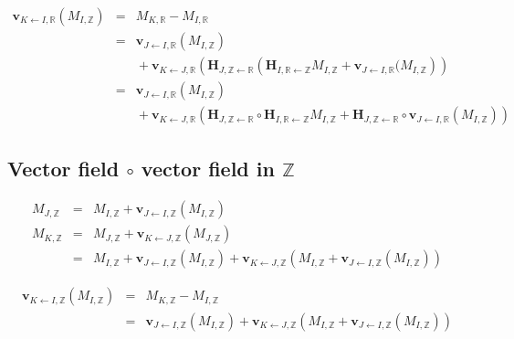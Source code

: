 \begin{eqnarray*}
\mathbf{v}_{K \leftarrow I, \mathbb{R}}(M_{I, \mathbb{Z}})
& = &
M_{K, \mathbb{R}} - M_{I, \mathbb{R}} \\
& = &
\mathbf{v}_{J \leftarrow I, \mathbb{R}}(M_{I, \mathbb{Z}}) \\
& & {}
+ \mathbf{v}_{K \leftarrow J, \mathbb{R}}
\left(
\mathbf{H}_{J, \mathbb{Z} \leftarrow \mathbb{R}} 
\left( 
\mathbf{H}_{I, \mathbb{R} \leftarrow \mathbb{Z}} M_{I, \mathbb{Z}}
+ 
\mathbf{v}_{J \leftarrow I, \mathbb{R}}(M_{I, \mathbb{Z}}
\right)
\right) \\
& = &
\mathbf{v}_{J \leftarrow I, \mathbb{R}}(M_{I, \mathbb{Z}}) \\
& & {}
+ \mathbf{v}_{K \leftarrow J, \mathbb{R}}
\left(
\mathbf{H}_{J, \mathbb{Z} \leftarrow \mathbb{R}} 
\circ
\mathbf{H}_{I, \mathbb{R} \leftarrow \mathbb{Z}} M_{I, \mathbb{Z}}
+ 
\mathbf{H}_{J, \mathbb{Z} \leftarrow \mathbb{R}} 
\circ \mathbf{v}_{J \leftarrow I, \mathbb{R}}(M_{I, \mathbb{Z}})
\right)
\end{eqnarray*}





\subsection{Vector field $\circ$ vector field in $\mathbb{Z}$ }


\begin{eqnarray*}
M_{J, \mathbb{Z}} & =  &
M_{I, \mathbb{Z}} 
+ \mathbf{v}_{J \leftarrow I, \mathbb{Z}}( M_{I, \mathbb{Z}}) \\
M_{K, \mathbb{Z}} & = &
M_{J, \mathbb{Z}} 
+ \mathbf{v}_{K \leftarrow J, \mathbb{Z}}(M_{J, \mathbb{Z}}) \\
& = &
M_{I, \mathbb{Z}}
+ \mathbf{v}_{J \leftarrow I, \mathbb{Z}}(M_{I, \mathbb{Z}}) 
+ \mathbf{v}_{K\leftarrow J, \mathbb{Z}}\left(
M_{I, \mathbb{Z}} 
+ \mathbf{v}_{J \leftarrow I, \mathbb{Z}}( M_{I, \mathbb{Z}})
\right)
\end{eqnarray*}


\begin{eqnarray*}
\mathbf{v}_{K \leftarrow I, \mathbb{Z}}(M_{I, \mathbb{Z}})
& = &
M_{K, \mathbb{Z}} - M_{I, \mathbb{Z}} \\
& = &
\mathbf{v}_{J \leftarrow I, \mathbb{Z}}(M_{I, \mathbb{Z}}) 
+ \mathbf{v}_{K\leftarrow J, \mathbb{Z}}\left(
M_{I, \mathbb{Z}} 
+ \mathbf{v}_{J \leftarrow I, \mathbb{Z}}( M_{I, \mathbb{Z}})
\right)
\end{eqnarray*}






